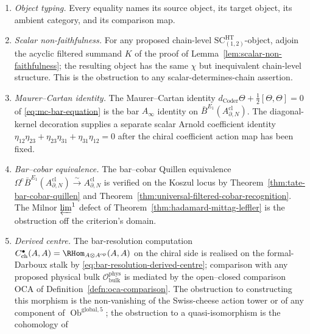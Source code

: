 \begin{enumerate}[label=\textup{(V\arabic*)}]
  \item \emph{Object typing.}  Every equality names its
        source object, its target object, its ambient category, and
        its comparison map.
  \item \emph{Scalar non-faithfulness.}  For any proposed
        chain-level
        \(\mathrm{SC}^{\mathrm{HT}}_{(1,2)}\)-object, adjoin the
        acyclic filtered summand \(K\) of the proof of
        Lemma~\ref{lem:scalar-non-faithfulness}; the resulting object
        has the same \(\chi\) but inequivalent chain-level structure.
        This is the obstruction to any scalar-determines-chain
        assertion.
	  \item \emph{Maurer--Cartan identity.}  The Maurer--Cartan identity
	        \(d_{\operatorname{Coder}}\Theta+\tfrac12[\Theta,\Theta]=0\) of
	        \eqref{eq:mc-bar-equation} is the bar \(A_\infty\) identity on
	        \(\bar B^{E_1}(A^{\mathrm{cl}}_{\partial,N})\).  The
	        diagonal-kernel decoration supplies a separate scalar Arnold
	        coefficient identity
	        \(\eta_{12}\eta_{23}+\eta_{23}\eta_{31}+\eta_{31}\eta_{12}=0\)
	        after the chiral coefficient action map has been fixed.
  \item \emph{Bar--cobar equivalence.}  The bar--cobar Quillen equivalence
        \(\Omega^{\mathrm{c}}\bar B^{E_1}(A^{\mathrm{cl}}_{\partial,N})
        \xrightarrow{\sim}A^{\mathrm{cl}}_{\partial,N}\) is verified
        on the Koszul locus by
        Theorem~\ref{thm:tate-bar-cobar-quillen} and
        Theorem~\ref{thm:universal-filtered-cobar-recognition}.  The
        Milnor \(\varprojlim^1\) defect of
        Theorem~\ref{thm:hadamard-mittag-leffler} is the obstruction
        off the criterion's domain.
  \item \emph{Derived centre.}  The bar-resolution computation
        \(C^\bullet_{\mathrm{ch}}(A,A)=\RHom_{A\otimes A^{\mathrm{op}}}(A,A)\)
        on the chiral side is realised on the formal-Darboux stalk by
        \eqref{eq:bar-resolution-derived-centre}; comparison with any
        proposed physical bulk \(\mathcal O^{\mathrm{phys}}_{\mathrm{bulk}}\)
        is mediated by the open--closed comparison
        \(\mathrm{OCA}\) of Definition~\ref{defn:oca-comparison}.  The
        obstruction to constructing this morphism is the non-vanishing of
        the Swiss-cheese action tower or of any component of
        \(\operatorname{Ob}^{\mathrm{global},5}\); the obstruction to a
        quasi-isomorphism is the cohomology of

\end{enumerate}
